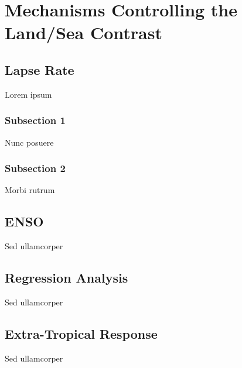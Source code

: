 \chapter{Mechanisms Controlling the Land/Sea Contrast} 

\label{mechanisms} 



\section{Lapse Rate}

Lorem ipsum

\subsection{Subsection 1}

Nunc posuere 


\subsection{Subsection 2}
Morbi rutrum 


\section{ENSO}

Sed ullamcorper




\section{Regression Analysis}

Sed ullamcorper


\section{Extra-Tropical Response}

Sed ullamcorper